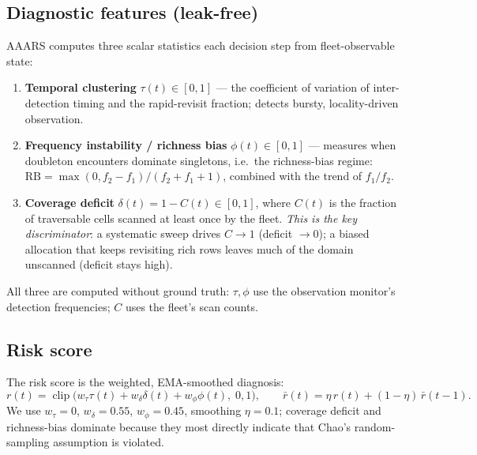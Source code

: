 \documentclass[11pt]{article}
\newcommand{\ra}{\rightarrow}
\begin{document}
\subsection{Diagnostic features (leak-free)}
AAARS computes three scalar statistics each decision step from fleet-observable state:
\begin{enumerate}
\item \textbf{Temporal clustering} $\tau(t)\in[0,1]$ --- the coefficient of variation of
inter-detection timing and the rapid-revisit fraction; detects bursty, locality-driven observation.
\item \textbf{Frequency instability / richness bias} $\phi(t)\in[0,1]$ --- measures when doubleton
encounters dominate singletons, i.e.\ the richness-bias regime: $\mathrm{RB}=\max(0,f_2-f_1)/
(f_2+f_1+1)$, combined with the trend of $f_1/f_2$.
\item \textbf{Coverage deficit} $\delta(t)=1-C(t)\in[0,1]$, where $C(t)$ is the fraction of
traversable cells scanned at least once by the fleet. \emph{This is the key discriminator}: a
systematic sweep drives $C\ra 1$ (deficit $\ra 0$); a biased allocation that keeps revisiting rich
rows leaves much of the domain unscanned (deficit stays high).
\end{enumerate}
All three are computed without ground truth: $\tau,\phi$ use the observation monitor's detection
frequencies; $C$ uses the fleet's scan counts.

\subsection{Risk score}
The risk score is the weighted, EMA-smoothed diagnosis:
\begin{equation}
r(t) = \operatorname{clip}\bigl( w_\tau \tau(t) + w_\delta \delta(t) + w_\phi \phi(t),\; 0, 1 \bigr),
\qquad
\bar r(t)=\eta\, r(t)+(1-\eta)\,\bar r(t-1).
\label{eq:risk}
\end{equation}
We use $w_\tau=0$, $w_\delta=0.55$, $w_\phi=0.45$, smoothing $\eta=0.1$; coverage deficit and
richness-bias dominate because they most directly indicate that Chao's random-sampling assumption is
violated.
\end{document}
